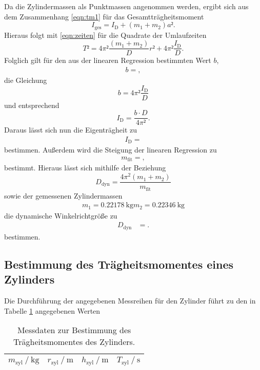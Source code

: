 Da die Zylindermassen als Punktmassen angenommen werden, ergibt sich aus dem Zusammenhang \eqref{eqn:tm1} für das Gesamtträgheitsmoment
\begin{equation}
  I_{\text{ges}} = I_{\text{D}} + (m_1+m_2)a².
\end{equation}
Hieraus folgt mit \eqref{eqn:zeiten} für die Quadrate der Umlaufzeiten
\begin{equation}
  T² = 4\pi² \frac{(m_1+m_2)}{D}r² + 4\pi² \frac{I_{\text{D}}}{D}.
\end{equation}
Folglich gilt für den aus der linearen Regression bestimmten Wert $b$,
\begin{align*}
  b = ,
\end{align*}
die Gleichung
\begin{equation}
  b = 4\pi² \frac{I_{\text{D}}}{D}
\end{equation}
und entsprechend
\begin{equation}
  I_{\text{D}} = \frac{b \cdot D}{4\pi²}.
\end{equation}
Daraus lässt sich nun die Eigenträgheit zu
\begin{align*}
  I_{\text{D}} = 
\end{align*}
bestimmen.
Außerdem wird die Steigung der linearen Regression zu
\begin{align*}
  m_{\text{fit}} = ,
\end{align*}
bestimmt.
Hieraus lässt sich mithilfe der Beziehung
\begin{equation}
  D_\text{dyn} = \frac{4 \pi^2 (m_1 + m_2)}{m_\text{fit}}
\end{equation}
sowie der gemessenen Zylindermassen
\begin{align*}
m_1 = \SI{0.22178}{\kilo\gram}
m_2 = \SI{0.22346}{\kilo\gram}
\end{align*}
die dynamische Winkelrichtgröße zu
\begin{align*}
  D_\text{dyn}   &=   .
\end{align*}
bestimmen.
\subsection{Bestimmung des Trägheitsmomentes eines Zylinders}
Die Durchführung der angegebenen Messreihen für den Zylinder führt zu den in Tabelle \ref{tab:zyl} angegebenen Werten

\begin{table}[H]
  \centering
  \caption{Messdaten zur Bestimmung des Trägheitsmomentes des Zylinders.}
  \label{tab:zyl}
  \begin{tabular}{c c c c}
    \toprule
    {$m_\text{zyl} \ /\ \si{\kilo\gram}$} & {$r_\text{zyl} \ /\ \si{\metre}$} & {$h_\text{zyl} \ /\ \si{\metre}$} & {$T_\text{zyl} \ /\ \si{\second}$}\\
    \midrule
    
    \bottomrule
  \end{tabular}
\end{table}

